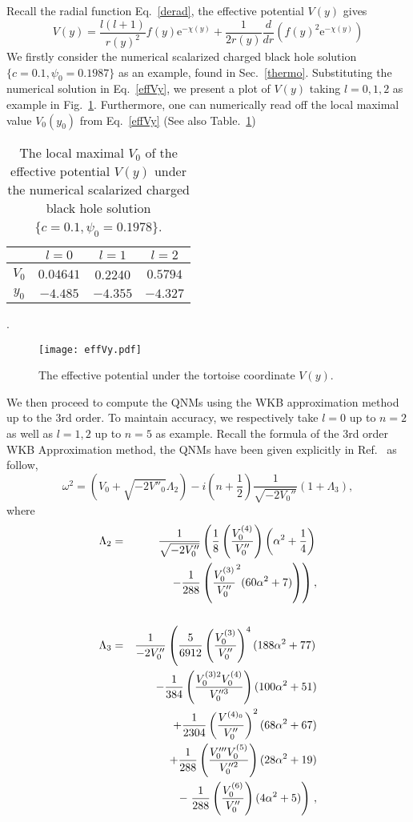 \documentclass[pr, twocolumn, preprintnumbers, showpacs,footnoteadded, superscriptaddress,nofootinbib,longbibliography]{revtex4-1}
\newcommand{\te}{\mathrm{e}}
\begin{document}
Recall the radial function Eq.~\eqref{derad}, the effective potential $V(y)$ gives
%
\begin{equation}\label{effVy}
V(y)=\frac{l(l+1)}{r(y)^2}f(y) \te^{-\chi(y)}+\frac{1}{2r(y)}\frac{d}{dr}\left(f(y)^2 \te^{-\chi(y)}\right)
\end{equation}
%
We firstly consider the numerical scalarized charged black hole solution $\{c=0.1 ,\psi_0=0.1987\}$ as an example, found in Sec.~\ref{thermo}. Substituting the numerical solution in Eq.~\eqref{effVy}, we present a plot of $V(y)$ taking $l=0,1,2$ as example in Fig.~\ref{effV1}. Furthermore, one can numerically read off the local maximal value $V_0(y_0)$ from Eq.~\eqref{effVy} (See also Table.~\ref{V0y0})
%
\begin{table}[hbtp]
\centering
\begin{tabular}{c|c|c|c}
  \hline
  \hline
  & $l=0$ & $l=1$ & $l=2$ \\
  \hline
 $V_0$ & $ 0.04641$ & 0.2240 & $0.5794$  \\
  \hline
  $y_0$& $ -4.485$ & $ -4.355$ & $-4.327$         \\
 \hline
 \hline
\end{tabular}.
\caption{The local maximal $V_0$ of the effective potential $V(y)$ under the numerical scalarized charged black hole solution $\{c=0.1, \psi_0=0.1978 \}$. } \label{V0y0}
\end{table}
%
%
\begin{figure}[h]
  \centering
  \texttt{[image: effVy.pdf]}
  \caption{ The effective potential under the tortoise coordinate $V(y)$. }\label{effV1}
\end{figure}
%
We then proceed to compute the QNMs using the WKB approximation method up to the 3rd order. To maintain accuracy, we respectively take $l=0$ up to $n=2$ as well as $l=1,2$ up to $n=5$ as example. Recall the formula of the 3rd order WKB Approximation method, the QNMs have been given explicitly in Ref.~\cite{Iyer:1986np,Iyer:1986nq} as follow,
%
\begin{equation}
\omega^2=(V_0+\sqrt{-2V''_{0}} \Lambda_2)-i(n+\frac{1}{2})\frac{1}{\sqrt{-2 V_0''}}(1+\Lambda_3),
\end{equation}
%
where
%
\begin{eqnarray}\label{WKB}
\Lambda_2 &=& \frac{1}{\sqrt{-2 V_0''}}\left(\frac{1}{8}\left(\frac{V^{(4)}_0}{V_0''}\right)\left(\alpha^2+\frac{1}{4}\right)\right. \cr
&&\left.-\frac{1}{288}\left(\frac{V^{(3)}_0}{V_0''}^2(60\alpha^2+7) \right)\right), \nonumber  \\
~ \cr
\Lambda_3 &=& \frac{1}{-2V_0''}\left(\frac{5}{6912}\left(\frac{V^{(3)}_0}{V_0''}\right)^4(188\alpha^2+77)\right. \cr
&&-\frac{1}{384}\left(\frac{V^{(3)2}_0V^{(4)}_0}{V''^3_0}\right) (100\alpha^2+51)\cr
&&+\frac{1}{2304}\left(\frac{V^{(4)_0}}{V''_0}\right)^2(68\alpha^2+67) \cr
&&+\frac{1}{288}\left(\frac{V'''_0 V^{(5)}_0}{V''^2_0} \right) (28\alpha^2+19) \cr
&&- \left.\frac{1}{288}\left(\frac{V^{(6)}_0}{V''_0}\right)(4\alpha^2+5) \right)\, ,
\end{eqnarray}
\end{document}
